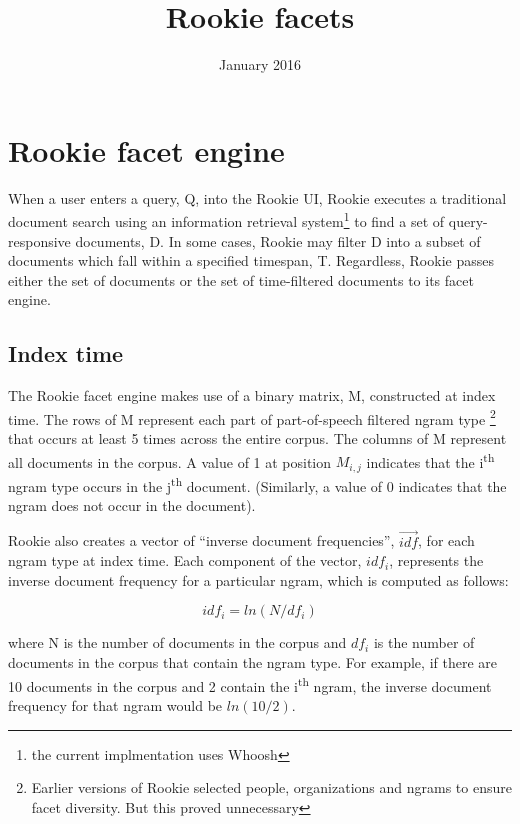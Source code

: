 \documentclass{article}
\title{Rookie facets}
\author{}
\date{January 2016}
\begin{document}
\maketitle

\section{Rookie facet engine}

When a user enters a query, Q, into the Rookie UI, Rookie executes a traditional document search using an information retrieval system\footnote {the current implmentation uses Whoosh} to find a set of query-responsive documents, D. In some cases, Rookie may filter D into a subset of documents which fall within a specified timespan, T. Regardless, Rookie passes either the set of documents or the set of time-filtered documents to its facet engine.

\subsection{Index time}

The Rookie facet engine makes use of a binary matrix, M, constructed at index time. The rows of M represent each part of part-of-speech filtered ngram type \footnote{Earlier versions of Rookie selected people, organizations and ngrams to ensure facet diversity. But this proved unnecessary} that occurs at least 5 times across the entire corpus. The columns of M represent all documents in the corpus. A value of 1 at position $M_{i,j}$ indicates that the i\textsuperscript{th} ngram type occurs in the j\textsuperscript{th} document. (Similarly, a value of 0 indicates that the ngram does not occur in the document).

Rookie also creates a vector of ``inverse document frequencies'', $\vec{idf}$, for each ngram type at index time. Each component of the vector, $idf_{i}$, represents the inverse document frequency for a particular ngram, which is computed as follows:

\begin{equation}
idf_{i} = ln(N/df_i)
\end{equation}

\noindent where N is the number of documents in the corpus and $df_{i}$ is the number of documents in the corpus that contain the ngram type. For example, if there are 10 documents in the corpus and 2 contain the i\textsuperscript{th} ngram, the inverse document frequency for that ngram would be $ln(10/2)$.
\end{document}
